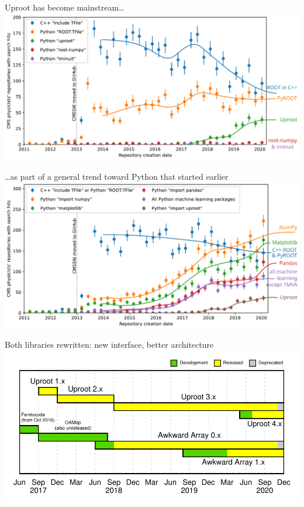 \documentclass[aspectratio=169]{beamer}
\begin{document}
\begin{frame}{Uproot has become mainstream\ldots}
\vspace{0.75 cm}
\includegraphics[width=\linewidth]{03-github-root-python.pdf}
\end{frame}

\begin{frame}{\ldots as part of a general trend toward Python that started earlier}
\vspace{0.75 cm}
\includegraphics[width=\linewidth]{05-github-anyroot-python-machinelearning-uproot.pdf}
\end{frame}

\begin{frame}{Both libraries rewritten: new interface, better architecture}
\vspace{0.5 cm}
\includegraphics[width=\linewidth]{uproot-awkward-timeline.pdf}
\end{frame}
\end{document}
